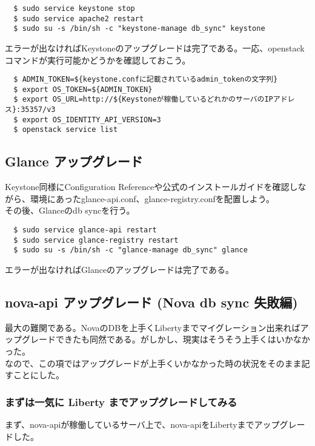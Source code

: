 \documentclass[9pt,b5paper,tombo,openany]{jsbook}
\begin{document}
\begin{lstlisting}
  $ sudo service keystone stop
  $ sudo service apache2 restart
  $ sudo su -s /bin/sh -c "keystone-manage db_sync" keystone
\end{lstlisting}

エラーが出なければKeystoneのアップグレードは完了である。一応、openstackコマンドが実行可能かどうかを確認しておこう。

\begin{lstlisting}
  $ ADMIN_TOKEN=${keystone.confに記載されているadmin_tokenの文字列}
  $ export OS_TOKEN=${ADMIN_TOKEN}
  $ export OS_URL=http://${Keystoneが稼働しているどれかのサーバのIPアドレス}:35357/v3
  $ export OS_IDENTITY_API_VERSION=3
  $ openstack service list
\end{lstlisting}

\subsection{Glance アップグレード}
Keystone同様にConfiguration Referenceや公式のインストールガイドを確認しながら、環境にあったglance-api.conf、glance-registry.confを配置しよう。\\[1ex]

\noindent
その後、Glanceのdb syncを行う。

\begin{lstlisting}
  $ sudo service glance-api restart
  $ sudo service glance-registry restart
  $ sudo su -s /bin/sh -c "glance-manage db_sync" glance
\end{lstlisting}

\noindent
エラーが出なければGlanceのアップグレードは完了である。

\subsection{nova-api アップグレード (Nova db sync 失敗編)}
最大の難関である。NovaのDBを上手くLibertyまでマイグレーション出来ればアップグレードできたも同然である。がしかし、現実はそうそう上手くはいかなかった。\\[1ex]

\noindent
なので、この項ではアップグレードが上手くいかなかった時の状況をそのまま記すことにした。

\subsubsection{まずは一気に Liberty までアップグレードしてみる}
\noindent
まず、nova-apiが稼働しているサーバ上で、nova-apiをLibertyまでアップグレードした。
\end{document}
